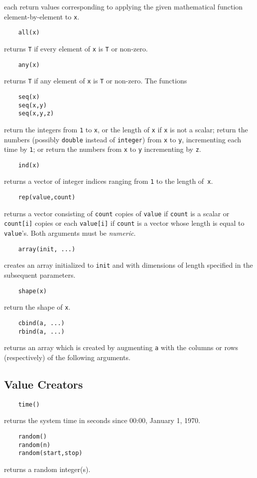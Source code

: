each return values corresponding to applying the given mathematical function
element-by-element to {\tt x}.
\begin{verbatim}
    all(x)
\end{verbatim}
returns {\tt T} if every element of {\tt x} is {\tt T} or non-zero.
\begin{verbatim}
    any(x)
\end{verbatim}
returns {\tt T} if any element of {\tt x} is {\tt T} or non-zero.
The functions
\begin{verbatim}
    seq(x)
    seq(x,y)
    seq(x,y,z)
\end{verbatim}
return the integers from {\tt 1} to {\tt x}, or the length of {\tt x}
if {\tt x} is not a scalar; return the numbers (possibly {\tt double}
instead of {\tt integer}) from {\tt x} to {\tt y}, incrementing each
time by {\tt 1}; or return the numbers from {\tt x} to {\tt y} incrementing
by {\tt z}.
\begin{verbatim}
    ind(x)
\end{verbatim}
returns a vector of integer indices ranging from {\tt 1} to the length
of{\tt~x}.
\begin{verbatim}
    rep(value,count)
\end{verbatim}
returns a vector consisting of {\tt count} copies of {\tt value} if
{\tt count} is a scalar or {\tt count[i]} copies or each {\tt value[i]}
if {\tt count} is a vector whose length is equal to {\tt value}'s. Both
arguments must be {\em numeric}.
\begin{verbatim}
    array(init, ...)
\end{verbatim}
creates an array initialized to {\tt init} and with dimensions of length
specified in the subsequent parameters.
\begin{verbatim}
    shape(x)
\end{verbatim}
return the shape of {\tt x}.
\begin{verbatim}
    cbind(a, ...)
    rbind(a, ...)
\end{verbatim}
returns an array which is created by augmenting {\tt a} with the columns
or rows (respectively) of the following arguments.

\subsection{Value Creators}
\begin{verbatim}
    time()
\end{verbatim}
returns the system time in seconds since 00:00, January 1, 1970.
\begin{verbatim}
    random()
    random(n)
    random(start,stop)
\end{verbatim}
returns a random integer(s).

